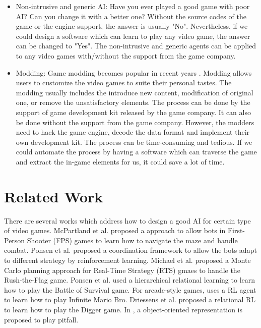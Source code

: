 \begin{itemize}{}
\item Non-intrusive and generic AI:
Have you ever played a good game with poor AI? Can you change it with a better one?
Without the source codes of the game or the engine support, the answer is usually "No".
Nevertheless, if we could design a software which can learn to play any video game, 
the answer can be changed to "Yes". The non-intrusive and generic agents can be 
applied to any video games with/without the support from the game company.

\item Modding: 
Game modding becomes popular in recent years \cite{Modding}. 
Modding allows users to customize the video games to suite their personal tastes.
The modding usually includes the introduce new content, modification of original one, or remove the unsatisfactory elements.
The process can be done by the support of game development kit released by the game company.
It can also be done without the support from the game company. However, the modders need to hack the game engine,
decode the data format and implement their own development kit. 
The process can be time-consuming and tedious.
If we could automate the process by having a software which can 
traverse the game and extract the in-game elements for us, it could save a lot of time.

\end{itemize}

\chapter{Related Work}
\label{ch:Related}

There are several works which address how to design a good AI for certain type of video games.
McPartland et al. proposed a approach to allow bots in First-Person Shooter (FPS)
games to learn how to navigate the maze and handle combat. Ponsen et al. proposed a coordination 
framework to allow the bots adapt to different strategy by reinforcement learning. 
Michael et al. proposed a Monte Carlo planning approach for Real-Time Strategy (RTS) gmaes to handle
the Rush-the-Flag game. Ponsen et al. used a hierarchical relational learning to learn how to play
the Battle of Survival game. For arcade-style games, \cite{Mario} uses a RL agent to learn
how to play Infinite Mario Bro. Driessens et al. proposed a relational RL to learn how to play the Digger
game. In \cite{OO}, a object-oriented representation is proposed to play pitfall.

